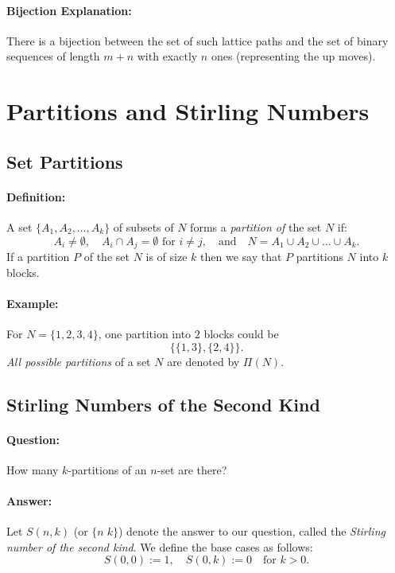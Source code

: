 \documentclass{article}
\begin{document}
\paragraph{Bijection Explanation:}  
There is a bijection between the set of such lattice paths and the set of binary sequences of length $m+n$ with exactly $n$ ones (representing the up moves).

\section{Partitions and Stirling Numbers}
\subsection{Set Partitions}  
\paragraph{Definition:}  
A set \( \{ A_1, A_2, \dots, A_k \} \) of subsets of \( N \) forms a \emph{partition of} the set \( N \) if:
\[
A_i \neq \emptyset, \quad A_i \cap A_j = \emptyset \text{ for } i \neq j, \quad \text{and} \quad N = A_1 \cup A_2 \cup \dots \cup A_k.
\]
If a partition \( P \) of the set \( N \) is of size \( k \) then we say that \( P \) partitions \( N \) into \( k \) blocks. 
\paragraph{Example:}  
For \( N = \{1,2,3,4\} \), one partition into \( 2 \) blocks could be  
\[
\{\{1,3\}, \{2,4\}\}.
\]  
\emph{All possible partitions} of a set \( N \) are denoted by \( \Pi(N) \).

\subsection{Stirling Numbers of the Second Kind}
 \paragraph{Question:}  
How many \( k \)-partitions of an \( n \)-set are there?  
\paragraph{Answer:}  
Let \( S(n, k) \) (or \( \{n \; k\} \)) denote the answer to our question, called the \emph{Stirling number of the second kind}.  
We define the base cases as follows:  
\[
S(0,0) := 1, \quad S(0,k) := 0 \quad \text{for } k > 0.
\]  
\end{document}
